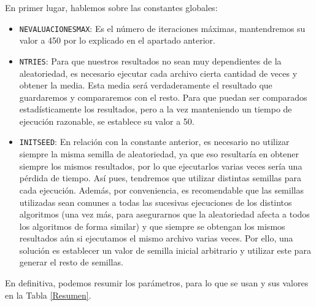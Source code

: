En primer lugar, hablemos sobre las constantes globales:
\begin{itemize}
	\item \texttt{NEVALUACIONESMAX}: Es el número de iteraciones máximas, mantendremos su valor a 450 por lo explicado en el apartado anterior. 
	\item \texttt{NTRIES}: Para que nuestros resultados no sean muy dependientes de la aleatoriedad, es necesario ejecutar cada archivo cierta cantidad de veces y obtener la media. 
Esta media será verdaderamente el resultado que guardaremos y compararemos con el resto. 
Para que puedan ser comparados estadísticamente los resultados, pero a la vez manteniendo un tiempo de ejecución razonable, se establece su valor a 50.
	\item \texttt{INITSEED}: En relación con la constante anterior, es necesario no utilizar siempre la misma semilla de aleatoriedad, ya que eso resultaría en obtener siempre los mismos resultados, por lo que ejecutarlos varias veces sería una pérdida de tiempo. 
Así pues, tendremos que utilizar distintas semillas para cada ejecución. 
Además, por conveniencia, es recomendable que las semillas utilizadas sean comunes a todas las sucesivas ejecuciones de los distintos algoritmos (una vez más, para asegurarnos que la aleatoriedad afecta a todos los algoritmos de forma similar) y que siempre se obtengan los mismos resultados aún si ejecutamos el mismo archivo varias veces. 
Por ello, una solución es establecer un valor de semilla inicial arbitrario y utilizar este para generar el resto de semillas.
\end{itemize}

En definitiva, podemos resumir los parámetros, para lo que se usan y sus valores en la Tabla \ref{Resumen}.

